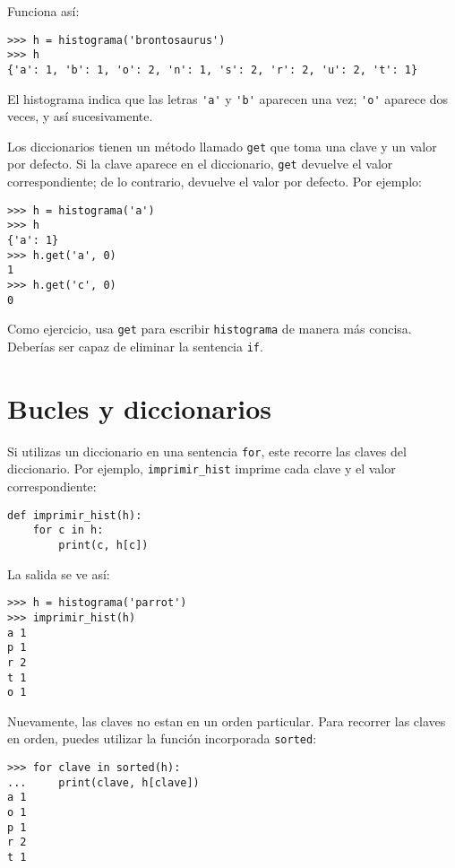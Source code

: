 \documentclass[10pt]{book}
\begin{document}
Funciona así:

\begin{verbatim}
>>> h = histograma('brontosaurus')
>>> h
{'a': 1, 'b': 1, 'o': 2, 'n': 1, 's': 2, 'r': 2, 'u': 2, 't': 1}
\end{verbatim}
%
El histograma indica que las letras \verb"'a'" y \verb"'b'"
aparecen una vez; \verb"'o'" aparece dos veces, y así sucesivamente.


Los diccionarios tienen un método llamado {\tt get} que toma una clave
y un valor por defecto.  Si la clave aparece en el diccionario,
{\tt get} devuelve el valor correspondiente; de lo contrario, devuelve
el valor por defecto.  Por ejemplo:

\begin{verbatim}
>>> h = histograma('a')
>>> h
{'a': 1}
>>> h.get('a', 0)
1
>>> h.get('c', 0)
0
\end{verbatim}
%
Como ejercicio, usa {\tt get} para escribir {\tt histograma} de manera más concisa.
Deberías ser capaz de eliminar la sentencia {\tt if}.


\section{Bucles y diccionarios}

Si utilizas un diccionario en una sentencia {\tt for}, este recorre
las claves del diccionario.  Por ejemplo, \verb"imprimir_hist"
imprime cada clave y el valor correspondiente:

\begin{verbatim}
def imprimir_hist(h):
    for c in h:
        print(c, h[c])
\end{verbatim}
%
La salida se ve así:

\begin{verbatim}
>>> h = histograma('parrot')
>>> imprimir_hist(h)
a 1
p 1
r 2
t 1
o 1
\end{verbatim}
%
Nuevamente, las claves no estan en un orden particular.  Para recorrer las claves
en orden, puedes utilizar la función incorporada {\tt sorted}:

\begin{verbatim}
>>> for clave in sorted(h):
...     print(clave, h[clave])
a 1
o 1
p 1
r 2
t 1
\end{verbatim}

\end{document}

